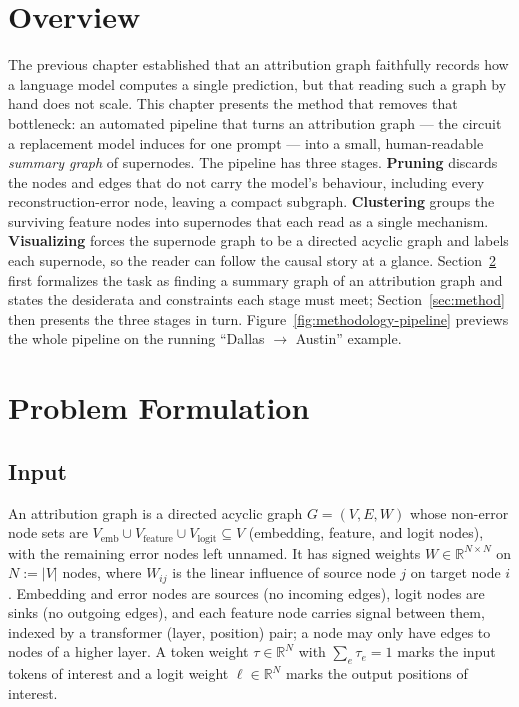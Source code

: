 \documentclass[../main.tex]{subfiles}
\begin{document}
\section{Overview}

The previous chapter established that an attribution graph faithfully records how a
language model computes a single prediction, but that reading such a graph by hand does
not scale. This chapter presents the method that removes that bottleneck: an automated
pipeline that turns an attribution graph --- the circuit a replacement model induces for
one prompt --- into a small, human-readable \emph{summary graph} of supernodes. The
pipeline has three stages. \textbf{Pruning} discards the nodes and edges that do not
carry the model's behaviour, including every reconstruction-error node, leaving a compact
subgraph. \textbf{Clustering} groups the surviving feature nodes into supernodes that each
read as a single mechanism. \textbf{Visualizing} forces the supernode graph to be a
directed acyclic graph and labels each supernode, so the reader can follow the causal
story at a glance. Section~\ref{sec:problem} first formalizes the task as finding a summary
graph of an attribution graph and states the desiderata and constraints each
stage must meet; Section~\ref{sec:method} then presents the three stages in turn.
Figure~\ref{fig:methodology-pipeline} previews the whole pipeline on the running
``Dallas $\to$ Austin'' example.



\section{Problem Formulation}
\label{sec:problem}

\subsection{Input}
An attribution graph is a directed acyclic graph $G = (V, E, W)$ whose non-error
node sets are
$V_{\text{emb}} \cup V_{\text{feature}} \cup V_{\text{logit}} \subseteq V$
(embedding, feature, and logit nodes), with the remaining error nodes left
unnamed. It has signed weights
$W \in \mathbb{R}^{N \times N}$ on $N := |V|$ nodes, where $W_{ij}$ is the linear
influence of source node $j$ on target node $i$. Embedding and error nodes are
sources (no incoming edges), logit nodes are sinks (no outgoing edges), and each
feature node carries signal between them, indexed by a transformer
(layer, position) pair; a node may only have edges to nodes of a higher layer.
A token weight $\tau \in \mathbb{R}^N$ with $\sum_e \tau_e = 1$ marks the input
tokens of interest and a logit weight $\ell \in \mathbb{R}^N$ marks the output
positions of interest.
\end{document}
